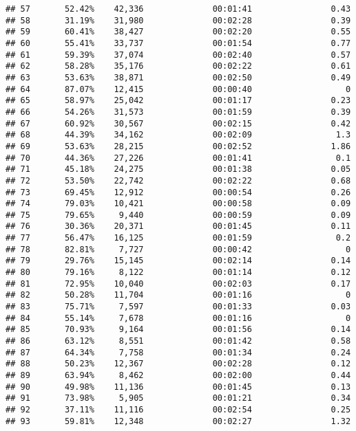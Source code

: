 \documentclass[
]{article}
\begin{document}
\begin{verbatim}
## 57       52.42%    42,336              00:01:41                0.43
## 58       31.19%    31,980              00:02:28                0.39
## 59       60.41%    38,427              00:02:20                0.55
## 60       55.41%    33,737              00:01:54                0.77
## 61       59.39%    37,074              00:02:40                0.57
## 62       58.28%    35,176              00:02:22                0.61
## 63       53.63%    38,871              00:02:50                0.49
## 64       87.07%    12,415              00:00:40                   0
## 65       58.97%    25,042              00:01:17                0.23
## 66       54.26%    31,573              00:01:59                0.39
## 67       60.92%    30,567              00:02:15                0.42
## 68       44.39%    34,162              00:02:09                 1.3
## 69       53.63%    28,215              00:02:52                1.86
## 70       44.36%    27,226              00:01:41                 0.1
## 71       45.18%    24,275              00:01:38                0.05
## 72       53.50%    22,742              00:02:22                0.68
## 73       69.45%    12,912              00:00:54                0.26
## 74       79.03%    10,421              00:00:58                0.09
## 75       79.65%     9,440              00:00:59                0.09
## 76       30.36%    20,371              00:01:45                0.11
## 77       56.47%    16,125              00:01:59                 0.2
## 78       82.81%     7,727              00:00:42                   0
## 79       29.76%    15,145              00:02:14                0.14
## 80       79.16%     8,122              00:01:14                0.12
## 81       72.95%    10,040              00:02:03                0.17
## 82       50.28%    11,704              00:01:16                   0
## 83       75.71%     7,597              00:01:33                0.03
## 84       55.14%     7,678              00:01:16                   0
## 85       70.93%     9,164              00:01:56                0.14
## 86       63.12%     8,551              00:01:42                0.58
## 87       64.34%     7,758              00:01:34                0.24
## 88       50.23%    12,367              00:02:28                0.12
## 89       63.94%     8,462              00:02:00                0.44
## 90       49.98%    11,136              00:01:45                0.13
## 91       73.98%     5,905              00:01:21                0.34
## 92       37.11%    11,116              00:02:54                0.25
## 93       59.81%    12,348              00:02:27                1.32

\end{verbatim}
\end{document}

